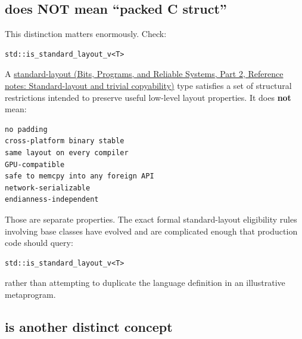\subsection{\texorpdfstring{ does NOT mean ``packed C struct''}{ does NOT mean ``packed C struct''}}\label{05-engine-i-ch003-standard-layout-does-not-mean-packed-c-struct}

\hypertarget{05-engine-i-ch003-standard-layout-does-not-mean-packed-c-struct}{}

This distinction matters enormously. Check:

\begin{verbatim}
std::is_standard_layout_v<T>
\end{verbatim}

A \href{../01-Bits-Programs-and-Reliable-Systems-P02/main.pdf\#nameddest=appendix-958870a64c53}{standard-layout (Bits, Programs, and Reliable Systems, Part 2, Reference notes: Standard-layout and trivial copyability)} type satisfies a set of structural restrictions intended to preserve useful low-level layout properties. It does \textbf{not} mean:

\begin{verbatim}
no padding
cross-platform binary stable
same layout on every compiler
GPU-compatible
safe to memcpy into any foreign API
network-serializable
endianness-independent
\end{verbatim}

Those are separate properties. The exact formal standard-layout eligibility rules involving base classes have evolved and are complicated enough that production code should query:

\begin{verbatim}
std::is_standard_layout_v<T>
\end{verbatim}

rather than attempting to duplicate the language definition in an illustrative metaprogram.

\subsection{\texorpdfstring{ is another distinct concept}{ is another distinct concept}}\label{05-engine-i-ch003-trivially_copyable-is-another-distinct-concept}

\hypertarget{05-engine-i-ch003-trivially_copyable-is-another-distinct-concept}{}


